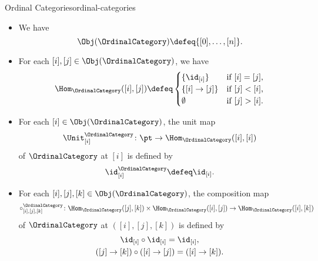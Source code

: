 \begin{example}{Ordinal Categories}{ordinal-categories}
\begin{itemize}
        \item{}We have
            \[
                \Obj(\OrdinalCategory)
                \defeq
                \{[0],\ldots,[n]\}.
            \]%
        \item{}For each $[i],[j]\in\Obj(\OrdinalCategory)$, we have
            \[
                \Hom_{\OrdinalCategory}([i],[j])
                \defeq
                \begin{cases}
                    \{\id_{[i]}\}                &\text{if $[i]=[j]$,}\\
                    \{[i]\to[j]\}    &\text{if $[j]<[i]$,}\\
                    \emptyset                    &\text{if $[j]>[i]$.}
                \end{cases}
            \]%
        \item{}For each $[i]\in\Obj(\OrdinalCategory)$, the unit map
            \[
                \Unit^{\OrdinalCategory}_{[i]}
                \colon
                \pt
                \to
                \Hom_{\OrdinalCategory}([i],[i])
            \]%
            of $\OrdinalCategory$ at $[i]$ is defined by
            \[
                \id^{\OrdinalCategory}_{[i]}
                \defeq
                \id_{[i]}.
            \]%
        \item{}For each $[i],[j],[k]\in\Obj(\OrdinalCategory)$, the composition map
            \[
                \circ^{\OrdinalCategory}_{[i],[j],[k]}
                \colon
                \Hom_{\OrdinalCategory}([j],[k])
                \times
                \Hom_{\OrdinalCategory}([i],[j])
                \to
                \Hom_{\OrdinalCategory}([i],[k])
            \]%
            of $\OrdinalCategory$ at $([i],[j],[k])$ is defined by%
            \[
                \begin{gathered}
                    \id_{[i]}\circ\id_{[i]}                             = \id_{[i]},\\%
                    ([j]\to[k])\circ([i]\to[j]) = ([i]\to[k]).%
                \end{gathered}
            \]%
    \end{itemize}
\end{example}
